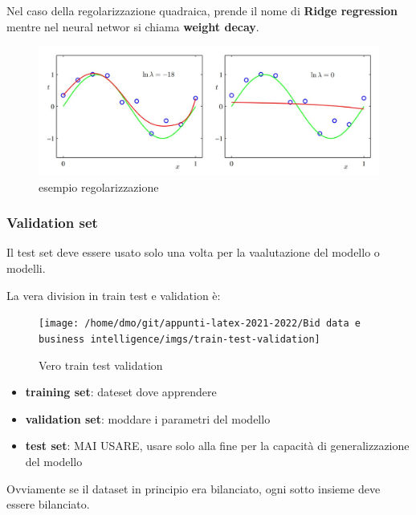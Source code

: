 Nel caso della regolarizzazione quadraica, prende il nome di \textbf{Ridge regression}
mentre nel neural networ si chiama \textbf{weight decay}.

\begin{figure}[H]
    \centering
    \includegraphics[width=0.5\linewidth]{imgs/esempio-lambda-regolarizzzazione}
    \caption{esempio regolarizzazione}
    \label{fig:esempio_lambda}
\end{figure}


\subsubsection{Validation set}
Il test set deve essere usato solo una volta per la vaalutazione del modello
 o modelli.

La vera division in train test e validation è:

\begin{figure}[H]
    \centering
    \texttt{[image: /home/dmo/git/appunti-latex-2021-2022/Bid data e business intelligence/imgs/train-test-validation]}
    \caption{Vero train test validation}
    \label{fig:train_test_val}
\end{figure}
\begin{itemize}
    \item \textbf{training set}: dateset dove apprendere
    \item \textbf{validation set}: moddare i parametri del modello
    \item \textbf{test set}: MAI USARE, usare solo alla fine per la capacità
    di generalizzazione del modello
\end{itemize}

Ovviamente se il dataset in principio era bilanciato, ogni sotto insieme deve
essere bilanciato.











